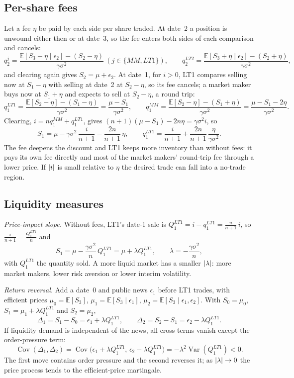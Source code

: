 \documentclass[a4paper,oneside,openany]{book}
\begin{document}
\subsection*{Per-share fees}
Let a fee $\eta$ be paid by each side per share traded. At date~2 a position is unwound either then or at date~3, so the fee enters both sides of each comparison and cancels:
\[ q_2^{j}=\frac{\mathbb{E}[S_3-\eta\mid\epsilon_2]-(S_2-\eta)}{\gamma\sigma^2}\ (j\in\{MM,LT1\}),\qquad
q_2^{LT2}=\frac{\mathbb{E}[S_3+\eta\mid\epsilon_2]-(S_2+\eta)}{\gamma\sigma^2}, \]
and clearing again gives $S_2=\mu+\epsilon_2$. At date~1, for $i>0$, LT1 compares selling now at $S_1-\eta$ with selling at date~2 at $S_2-\eta$, so its fee cancels; a market maker buys now at $S_1+\eta$ and expects to sell at $S_2-\eta$, a round trip:
\[ q_1^{LT1}=\frac{\mathbb{E}[S_2-\eta]-(S_1-\eta)}{\gamma\sigma^2}=\frac{\mu-S_1}{\gamma\sigma^2},\qquad
q_1^{MM}=\frac{\mathbb{E}[S_2-\eta]-(S_1+\eta)}{\gamma\sigma^2}=\frac{\mu-S_1-2\eta}{\gamma\sigma^2}. \]
Clearing, $i=nq_1^{MM}+q_1^{LT1}$, gives $(n+1)(\mu-S_1)-2n\eta=\gamma\sigma^2 i$, so
\[ S_1=\mu-\gamma\sigma^2\,\frac{i}{n+1}-\frac{2n}{n+1}\,\eta,\qquad
q_1^{LT1}=\frac{i}{n+1}+\frac{2n}{n+1}\,\frac{\eta}{\gamma\sigma^2}. \]
The fee deepens the discount and LT1 keeps more inventory than without fees: it pays its own fee directly and most of the market makers' round-trip fee through a lower price. If $\left\lvert i\right\rvert$ is small relative to $\eta$ the desired trade can fall into a no-trade region.

\subsection*{Liquidity measures}
\emph{Price-impact slope.} Without fees, LT1's date-1 sale is $Q_1^{LT1}=i-q_1^{LT1}=\frac{n}{n+1}\,i$, so $\frac{i}{n+1}=\frac{Q_1^{LT1}}{n}$ and
\[ S_1=\mu-\frac{\gamma\sigma^2}{n}\,Q_1^{LT1}=\mu+\lambda Q_1^{LT1},\qquad \lambda=-\frac{\gamma\sigma^2}{n}, \]
with $Q_1^{LT1}$ the quantity sold. A more liquid market has a smaller $\left\lvert\lambda\right\rvert$: more market makers, lower risk aversion or lower interim volatility.

\emph{Return reversal.} Add a date~0 and public news $\epsilon_1$ before LT1 trades, with efficient prices $\mu_0=\mathbb{E}[S_3]$, $\mu_1=\mathbb{E}[S_3\mid\epsilon_1]$, $\mu_2=\mathbb{E}[S_3\mid\epsilon_1,\epsilon_2]$. With $S_0=\mu_0$, $S_1=\mu_1+\lambda Q_1^{LT1}$ and $S_2=\mu_2$,
\[ \Delta_1=S_1-S_0=\epsilon_1+\lambda Q_1^{LT1},\qquad \Delta_2=S_2-S_1=\epsilon_2-\lambda Q_1^{LT1}. \]
If liquidity demand is independent of the news, all cross terms vanish except the order-pressure term:
\[ \operatorname{Cov}(\Delta_1,\Delta_2)=\operatorname{Cov}\big(\epsilon_1+\lambda Q_1^{LT1},\,\epsilon_2-\lambda Q_1^{LT1}\big)=-\lambda^2\operatorname{Var}(Q_1^{LT1})<0. \]
The first move contains order pressure and the second reverses it; as $\left\lvert\lambda\right\rvert\to0$ the price process tends to the efficient-price martingale.
\end{document}
